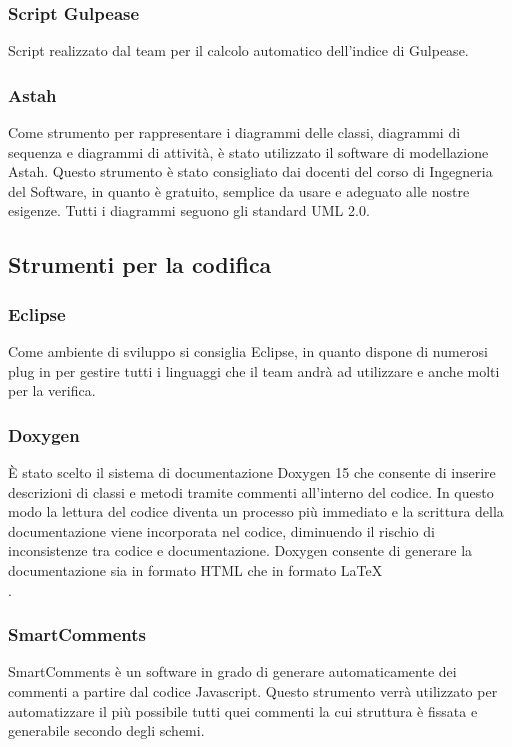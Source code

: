 \subsubsection{Script Gulpease}
\label{}
Script realizzato dal team per il calcolo automatico dell'indice di Gulpease.

\subsubsection{Astah}
Come strumento per rappresentare i diagrammi delle classi, diagrammi di sequenza e diagrammi di attività, è stato utilizzato il software di modellazione Astah. Questo strumento è stato consigliato dai docenti del corso di Ingegneria del Software, in quanto è gratuito, semplice da usare e adeguato alle nostre esigenze. Tutti i diagrammi seguono gli standard UML 2.0.


\subsection{Strumenti per la codifica}
\subsubsection{Eclipse}
Come ambiente di sviluppo si consiglia Eclipse, in quanto dispone di numerosi plug in per gestire tutti i linguaggi che il team andrà ad utilizzare e anche molti per la verifica.

\subsubsection{Doxygen}
È stato scelto il sistema di documentazione Doxygen 15 che consente di inserire descrizioni di classi e metodi tramite commenti all’interno del codice. In questo modo la lettura del codice diventa un processo più immediato e la scrittura della documentazione viene incorporata nel codice, diminuendo il rischio di inconsistenze tra codice e 
documentazione. Doxygen consente di generare la documentazione sia in formato HTML che in formato \LaTeX\\.

\subsubsection{SmartComments}
SmartComments è un software in grado di generare automaticamente dei commenti a partire dal codice Javascript.
Questo strumento verrà utilizzato per automatizzare il più possibile tutti quei commenti la cui struttura è fissata e generabile secondo degli schemi.

